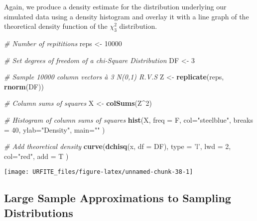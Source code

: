 \documentclass[]{book}
\newenvironment{Shaded}{\begin{snugshade}}{\end{snugshade}}
\newcommand{\KeywordTok}[1]{\textcolor[rgb]{0.13,0.29,0.53}{\textbf{#1}}}
\newcommand{\DataTypeTok}[1]{\textcolor[rgb]{0.13,0.29,0.53}{#1}}
\newcommand{\DecValTok}[1]{\textcolor[rgb]{0.00,0.00,0.81}{#1}}
\newcommand{\StringTok}[1]{\textcolor[rgb]{0.31,0.60,0.02}{#1}}
\newcommand{\CommentTok}[1]{\textcolor[rgb]{0.56,0.35,0.01}{\textit{#1}}}
\newcommand{\OperatorTok}[1]{\textcolor[rgb]{0.81,0.36,0.00}{\textbf{#1}}}
\newcommand{\NormalTok}[1]{#1}
\theoremstyle{definition}
\theoremstyle{definition}
\theoremstyle{definition}
\theoremstyle{remark}
\begin{document}
Again, we produce a density estimate for the distribution underlying our
simulated data using a density histogram and overlay it with a line
graph of the theoretical density function of the \(\chi^2_3\)
distribution.

\begin{Shaded}
\begin{Highlighting}[]
\CommentTok{# Number of repititions}
\NormalTok{reps <-}\StringTok{ }\DecValTok{10000}

\CommentTok{# Set degrees of freedom of a chi-Square Distribution}
\NormalTok{DF <-}\StringTok{ }\DecValTok{3} 

\CommentTok{# Sample 10000 column vectors à 3 N(0,1) R.V.S}
\NormalTok{Z <-}\StringTok{ }\KeywordTok{replicate}\NormalTok{(reps, }\KeywordTok{rnorm}\NormalTok{(DF)) }

\CommentTok{# Column sums of squares}
\NormalTok{X <-}\StringTok{ }\KeywordTok{colSums}\NormalTok{(Z}\OperatorTok{^}\DecValTok{2}\NormalTok{)}

\CommentTok{# Histogram of column sums of squares}
\KeywordTok{hist}\NormalTok{(X, }
     \DataTypeTok{freq =}\NormalTok{ F, }
     \DataTypeTok{col=}\StringTok{"steelblue"}\NormalTok{, }
     \DataTypeTok{breaks =} \DecValTok{40}\NormalTok{, }
     \DataTypeTok{ylab=}\StringTok{"Density"}\NormalTok{, }
     \DataTypeTok{main=}\StringTok{""}
\NormalTok{     )}

\CommentTok{# Add theoretical density}
\KeywordTok{curve}\NormalTok{(}\KeywordTok{dchisq}\NormalTok{(x, }\DataTypeTok{df =}\NormalTok{ DF), }
      \DataTypeTok{type =} \StringTok{'l'}\NormalTok{, }
      \DataTypeTok{lwd =} \DecValTok{2}\NormalTok{, }
      \DataTypeTok{col=}\StringTok{"red"}\NormalTok{, }
      \DataTypeTok{add =}\NormalTok{ T}
\NormalTok{      )}
\end{Highlighting}
\end{Shaded}

\begin{center}\texttt{[image: URFITE\_files/figure-latex/unnamed-chunk-38-1]} \end{center}

\subsection*{Large Sample Approximations to Sampling
Distributions}\label{large-sample-approximations-to-sampling-distributions}
\end{document}
